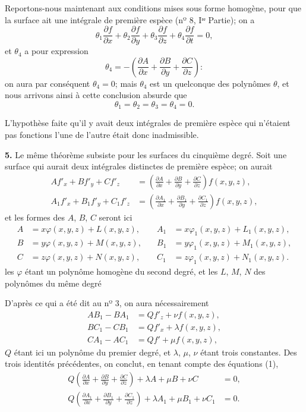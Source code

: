 \documentclass{article}
\begin{document}
Reportons-nous maintenant aux conditions mises sous forme homogène, pour que la surface ait une intégrale de première espèce (nº 8, Iʳᵉ Partie); on a
\[
\theta_{1}\frac{\partial f}{\partial x} + \theta_{2}\frac{\partial f}{\partial y} + \theta_{3}\frac{\partial f}{\partial z} + \theta_{4}\frac{\partial f}{\partial t} = 0,
\]
et $\theta_{4}$ a pour expression
\[
\theta_{4} = -\left(\frac{\partial A}{\partial x} + \frac{\partial B}{\partial y} + \frac{\partial C}{\partial z}\right):
\]
on aura par conséquent $\theta_{4} = 0$; mais $\theta_{4}$ est un quelconque des polynômes $\theta$, et nous arrivons ainsi à cette conclusion absurde que
\[
\theta_{1} = \theta_{2} = \theta_{3} = \theta_{4} = 0.
\]

L'hypothèse faite qu'il y avait deux intégrales de première espèce qui n'étaient pas fonctions l'une de l'autre était donc inadmissible.


\textbf{5.} Le même théorème subsiste pour les surfaces du cinquième degré. Soit une surface qui aurait deux intégrales distinctes de première espèce; on aurait
\[
\begin{aligned}
Af'_{x} + Bf'_{y} + Cf'_{z} &= \left(\frac{\partial A}{\partial x} + \frac{\partial B}{\partial y} + \frac{\partial C}{\partial z}\right) f(x, y, z), \\
A_{1}f'_{x} + B_{1}f'_{y} + C_{1}f'_{z} &= \left(\frac{\partial A_{1}}{\partial x} + \frac{\partial B_{1}}{\partial y} + \frac{\partial C_{1}}{\partial z}\right) f(x, y, z),
\end{aligned}
\tag{1}
\]
et les formes des $A$, $B$, $C$ seront ici
\[
\begin{aligned}
A &= x\varphi(x, y, z) + L(x, y, z), &\quad A_{1} &= x\varphi_{1}(x, y, z) + L_{1}(x, y, z), \\
B &= y\varphi(x, y, z) + M(x, y, z), &\quad B_{1} &= y\varphi_{1}(x, y, z) + M_{1}(x, y, z), \\
C &= z\varphi(x, y, z) + N(x, y, z), &\quad C_{1} &= z\varphi_{1}(x, y, z) + N_{1}(x, y, z).
\end{aligned}
\]
les $\varphi$ étant un polynôme homogène du second degré, et les $L$, $M$, $N$ des polynômes du même degré

D'après ce qui a été dit au nº 3, on aura nécessairement
\[
\begin{aligned}
AB_{1} - BA_{1} &= Qf'_{z} + \nu f(x, y, z), \\
BC_{1} - CB_{1} &= Qf'_{x} + \lambda f(x, y, z), \\
CA_{1} - AC_{1} &= Qf' + \mu f(x, y, z),
\end{aligned}
\tag{2}
\]
$Q$ étant ici un polynôme du premier degré, et $\lambda$, $\mu$, $\nu$ étant trois constantes. Des trois identités précédentes, on conclut, en tenant compte des équations (1),
\[
\begin{aligned}
Q\left(\frac{\partial A}{\partial x} + \frac{\partial B}{\partial y} + \frac{\partial C}{\partial z}\right) + \lambda A + \mu B + \nu C &= 0, \\
Q\left(\frac{\partial A_{1}}{\partial x} + \frac{\partial B_{1}}{\partial y} + \frac{\partial C_{1}}{\partial z}\right) + \lambda A_{1} + \mu B_{1} + \nu C_{1} &= 0.
\end{aligned}
\tag{3}
\]
\end{document}
